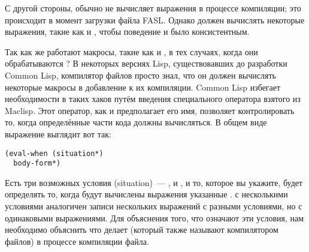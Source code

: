 С другой стороны,  обычно не вычисляет выражения в процессе компиляции;
это происходит в момент загрузки файла FASL. Однако  должен вычислять
некоторые выражения, такие как  и , чтобы поведение
 и  было консистентным.

Так как же работают макросы, такие как  и , в тех случаях,
когда они обрабатываются ?  В некоторых версиях Lisp, существовавших до
разработки Common Lisp, компилятор файлов просто знал, что он должен вычислять некоторые
макросы в добавление к их компиляции.  Common Lisp избегает необходимости в таких хаков
путём введения специального оператора  взятого из Maclisp.  Этот оператор,
как и предполагает его имя, позволяет контролировать то, когда определённые части кода
должны вычисляться. В общем виде выражение  выглядит вот так:

\begin{lstlisting}
(eval-when (situation*)
  body-form*)
\end{lstlisting}

Есть три возможных условия (situation)~--- , 
и , и то, которое вы укажите, будет определять то, когда будут вычислены
выражения указанные .   с несколькими условиями
аналогичен записи нескольких выражений  с разными условиями, но с
одинаковыми выражениями.  Для объяснения того, что означают эти условия, нам необходимо
объяснить что делает  (который также называют компилятором файлов) в
процессе компиляции файла.

